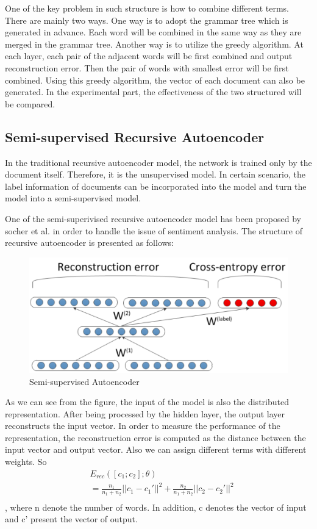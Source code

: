 \documentclass[dvips,9pt]{article}
\begin{document}
One of the key problem in such structure is how to combine different terms. There are mainly two ways. One way is to adopt the grammar tree which is generated in advance. Each word will be combined in the same way as they are merged in the grammar tree. Another way is to utilize the greedy algorithm. At each layer, each pair of the adjacent words will be first combined and output reconstruction error. Then the pair of words with smallest error will be first combined. Using this greedy algorithm, the vector of each document can also be generated. In the experimental part, the effectiveness of the two structured will be compared.

\subsection{Semi-supervised Recursive Autoencoder}
In the traditional recursive autoencoder model, the network is trained only by the document itself. Therefore, it is the unsupervised model. In certain scenario, the label information of documents can be incorporated into the model and turn the model into a semi-supervised model.

One of the semi-superivised recursive autoencoder model has been proposed by socher et al.\cite{socher2011semi} in order to handle the issue of sentiment analysis. The structure of recursive autoencoder is presented as follows:
\begin{figure}[ht]
\centering
\includegraphics[width = 1.0\linewidth]{figure/semiautoencoder}
\caption{Semi-supervised Autoencoder}
\label{fig:sae}
\end{figure}	
	
As we can see from the figure, the input of the model is also the distributed representation. After being processed by the hidden layer, the output layer reconstructs the input vector. In order to measure the performance of the representation, the reconstruction error is computed as the distance between the input vector and output vector. Also we can assign different terms with different weights. So
\begin{equation}
\begin{split}
 & E_{rec}([c_{1};c_{2}];\theta) \\
 & = \frac{n_{1}}{n_{1}+n_{2}} ||c_{1}-c_{1}'||^2 + \frac{n_{2}}{n_{1}+n_{2}} ||c_{2}-c_{2}'||^2\\
 \end{split}
\end{equation}
, where n denote the number of words. In addition, c denotes the vector of input and c' present the vector of output.
\end{document}
